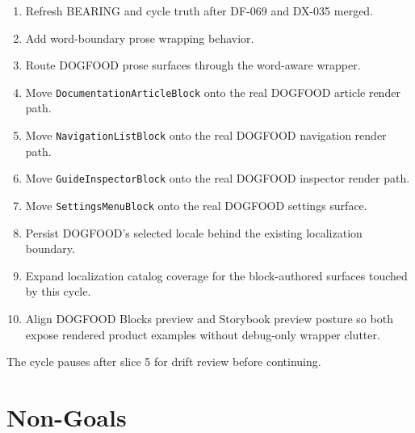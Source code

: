 \begin{enumerate}
\def\labelenumi{\arabic{enumi}.}
\tightlist
\item
  Refresh BEARING and cycle truth after DF-069 and DX-035 merged.
\item
  Add word-boundary prose wrapping behavior.
\item
  Route DOGFOOD prose surfaces through the word-aware wrapper.
\item
  Move \texttt{D\allowbreak{}o\allowbreak{}c\allowbreak{}u\allowbreak{}m\allowbreak{}e\allowbreak{}n\allowbreak{}t\allowbreak{}a\allowbreak{}t\allowbreak{}i\allowbreak{}o\allowbreak{}n\allowbreak{}A\allowbreak{}r\allowbreak{}t\allowbreak{}i\allowbreak{}c\allowbreak{}l\allowbreak{}e\allowbreak{}B\allowbreak{}l\allowbreak{}o\allowbreak{}c\allowbreak{}k} onto the real DOGFOOD article render path.
\item
  Move \texttt{N\allowbreak{}a\allowbreak{}v\allowbreak{}i\allowbreak{}g\allowbreak{}a\allowbreak{}t\allowbreak{}i\allowbreak{}o\allowbreak{}n\allowbreak{}L\allowbreak{}i\allowbreak{}s\allowbreak{}t\allowbreak{}B\allowbreak{}l\allowbreak{}o\allowbreak{}c\allowbreak{}k} onto the real DOGFOOD navigation render path.
\item
  Move \texttt{G\allowbreak{}u\allowbreak{}i\allowbreak{}d\allowbreak{}e\allowbreak{}I\allowbreak{}n\allowbreak{}s\allowbreak{}p\allowbreak{}e\allowbreak{}c\allowbreak{}t\allowbreak{}o\allowbreak{}r\allowbreak{}B\allowbreak{}l\allowbreak{}o\allowbreak{}c\allowbreak{}k} onto the real DOGFOOD inspector render path.
\item
  Move \texttt{S\allowbreak{}e\allowbreak{}t\allowbreak{}t\allowbreak{}i\allowbreak{}n\allowbreak{}g\allowbreak{}s\allowbreak{}M\allowbreak{}e\allowbreak{}n\allowbreak{}u\allowbreak{}B\allowbreak{}l\allowbreak{}o\allowbreak{}c\allowbreak{}k} onto the real DOGFOOD settings surface.
\item
  Persist DOGFOOD's selected locale behind the existing localization boundary.
\item
  Expand localization catalog coverage for the block-authored surfaces touched by this cycle.
\item
  Align DOGFOOD Blocks preview and Storybook preview posture so both expose rendered product examples without debug-only wrapper clutter.
\end{enumerate}

The cycle pauses after slice 5 for drift review before continuing.

\section{Non-Goals}\label{record-110-non-goals}

